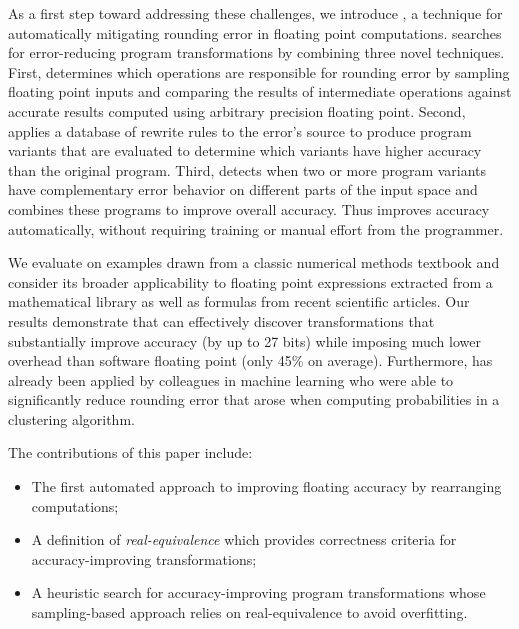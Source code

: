 \documentclass[paper.tex]{subfiles}
\begin{document}
As a first step toward addressing these challenges, we introduce
\casio, a technique for automatically mitigating rounding error in
floating point computations.  \casio searches for error-reducing
program transformations by combining three novel techniques.  First,
\casio determines which operations are responsible for rounding error
by sampling floating point inputs and comparing the results of
intermediate operations against accurate results computed using
arbitrary precision floating point.  Second, \casio applies a database
of rewrite rules to the error's source to produce program variants
that are evaluated to determine which variants have higher accuracy
than the original program. Third, \casio detects when two or more
program variants have complementary error behavior on different parts
of the input space and combines these programs to improve overall
accuracy. Thus \casio improves accuracy automatically, without
requiring training or manual effort from the programmer.

We evaluate \casio on examples drawn from a classic numerical methods
textbook and consider its broader applicability to floating point
expressions extracted from a mathematical library as well as formulas
from recent scientific articles.  Our results demonstrate that \casio
can effectively discover transformations that substantially improve
accuracy (by up to 27 bits) while imposing much lower overhead than
software floating point (only 45\% on average).  Furthermore, \casio
has already been applied by colleagues in machine learning who were
able to significantly reduce rounding error that arose when computing
probabilities in a clustering algorithm.

\medskip

\noindent The contributions of this paper include:
\begin{itemize}
\item The first automated approach to improving floating accuracy by
  rearranging computations;
\item A definition of \textit{real-equivalence} which provides
  correctness criteria for accuracy-improving transformations;
\item A heuristic search for accuracy-improving program
  transformations whose sampling-based approach relies on
  real-equivalence to avoid overfitting.
\end{itemize}

\end{document}
